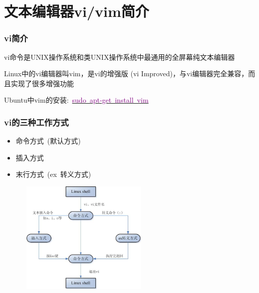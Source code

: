 \section{文本编辑器\rm{vi/vim}简介}
\frame
{
	\frametitle{\textrm{vi}简介}
	\textrm{vi}命令是\textrm{UNIX}操作系统和类\textrm{UNIX}操作系统中最通用的全屏幕纯文本编辑器

	\textrm{Linux}中的\textrm{vi}编辑器叫\textrm{vim}，是\textrm{vi}的增强版 \textrm{(vi Improved)}，与\textrm{vi}编辑器完全兼容，而且实现了很多增强功能
	
	\textrm{Ubuntu}中\textrm{vim}的安装:~\underline{\textcolor{purple}{sudo~apt-get~install~vim}}
\begin{figure}[h!]
\centering
\vspace*{0.1in}
\label{vim-open}
\end{figure} 
}

\frame
{
	\frametitle{\textrm{vi}的三种工作方式}
	\begin{itemize}
		\item 命令方式~\textrm{(默认方式)}
		\item 插入方式
		\item 末行方式~\textrm{(ex~转义方式)}
	\end{itemize}
\begin{figure}[h!]
\centering
\vspace{-6.0pt}
\includegraphics[height=2.15in,width=2.5in,viewport=0 0 610 555,clip]{Figures/vi.jpg}
\label{Linux-vi-command}
\end{figure}
}


